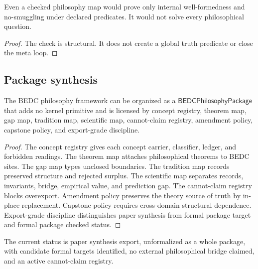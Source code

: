 \begin{corollary}
\label{cor:philosophy-formal-package-does-not-solve-philosophy}
Even a checked philosophy map would prove only internal well-formedness
and no-smuggling under declared predicates. It would not solve every
philosophical question.
\end{corollary}
\begin{proof}
The check is structural. It does not create a global truth predicate or
close the meta loop.
\end{proof}

\subsection{Package synthesis}
\label{subsec:philosophy-package-synthesis}

\begin{theorem}
\label{thm:philosophy-package-synthesis}
The BEDC philosophy framework can be organized as a
\(\mathsf{BEDCPhilosophyPackage}\) that adds no kernel primitive and is
licensed by concept registry, theorem map, gap map, tradition map,
scientific map, cannot-claim registry, amendment policy, capstone
policy, and export-grade discipline.
\end{theorem}
\begin{proof}
The concept registry gives each concept carrier, classifier, ledger,
and forbidden readings. The theorem map attaches philosophical
theorems to BEDC sites. The gap map types unclosed boundaries. The
tradition map records preserved structure and rejected surplus. The
scientific map separates records, invariants, bridge, empirical value,
and prediction gap. The cannot-claim registry blocks overexport.
Amendment policy preserves the theory source of truth by in-place
replacement. Capstone policy requires cross-domain structural
dependence. Export-grade discipline distinguishes paper synthesis from
formal package target and formal package checked status.
\end{proof}

\begin{corollary}
\label{cor:philosophy-package-current-status}
The current status is paper synthesis export, unformalized as a whole
package, with candidate formal targets identified, no external
philosophical bridge claimed, and an active cannot-claim registry.
\end{corollary}

